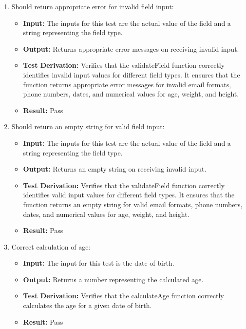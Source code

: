 \documentclass[12pt, titlepage]{article}
\begin{document}
  \begin{enumerate}
    \item Should return appropriate error for invalid field input:
      \begin{itemize}
        \item \textbf{Input:} The inputs for this test are the actual value of the field and a string representing the field type.   
        \item \textbf{Output:} Returns appropriate error messages on receiving invalid input.
        \item \textbf{Test Derivation:} Verifies that the validateField function correctly identifies invalid input values for different field types. It ensures that the function returns appropriate error messages for invalid email formats, phone numbers, dates, and numerical values for age, weight, and height.
        \item \textbf{Result:} Pass
      \end{itemize}

    \item Should return an empty string for valid field input:
      \begin{itemize}
        \item \textbf{Input:} The inputs for this test are the actual value of the field and a string representing the field type.   
        \item \textbf{Output:} Returns an empty string on receiving invalid input.
        \item \textbf{Test Derivation:} Verifies that the validateField function correctly identifies valid input values for different field types. It ensures that the function returns an empty string for valid email formats, phone numbers, dates, and numerical values for age, weight, and height.
        \item \textbf{Result:} Pass
      \end{itemize}

    \item Correct calculation of age:
      \begin{itemize}
        \item \textbf{Input:} The input for this test is the date of birth.    
        \item \textbf{Output:} Returns a number representing the calculated age.
        \item \textbf{Test Derivation:} Verifies that the calculateAge function correctly calculates the age for a given date of birth.
        \item \textbf{Result:} Pass
      \end{itemize}


\end{enumerate}
\end{document}
